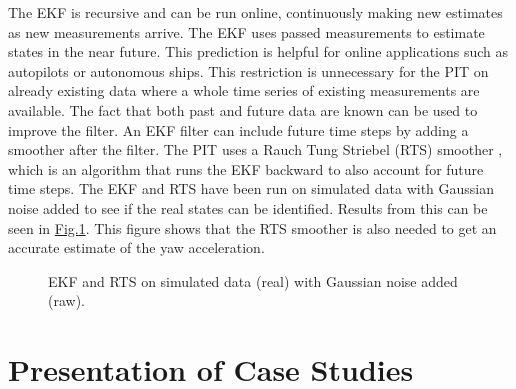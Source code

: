 \documentclass[review]{elsarticle}
\begin{document}
The EKF is recursive and can be run online, continuously making new estimates as new measurements arrive. The EKF uses passed measurements to estimate states in the near future. This prediction is helpful for online applications such as  autopilots or autonomous ships. This restriction is  unnecessary for the PIT on already existing data where a whole time series of existing measurements are available. The fact that both past and future data are known can be used to improve the filter. An EKF filter can include future time steps by adding a smoother after the filter. The PIT uses a Rauch Tung Striebel (RTS) smoother \cite{rauch_maximum_1965}, which is an algorithm that runs the EKF backward to also account for future time steps.
The EKF and RTS have been run on simulated data with Gaussian noise added to see if the real states can be identified. Results from this can be seen in  \hyperref[\detokenize{04.01_EK:fig-ekf}]{Fig.\@ \ref{\detokenize{04.01_EK:fig-ekf}}}. This figure shows that the RTS smoother is also needed to get an accurate estimate of the yaw acceleration.

 \begin{figure}[H]
 \centering
 \capstart

 \noindent{}
 \caption{EKF and RTS on simulated data (real) with Gaussian noise added (raw).}\label{\detokenize{04.01_EK:fig-ekf}}\end{figure}


\section{Presentation of Case Studies}
\label{\detokenize{05.01_case_studies:presentation-of-case-studies}}\label{\detokenize{05.01_case_studies:case-studies}}\label{\detokenize{05.01_case_studies::doc}}
  
\end{document}

